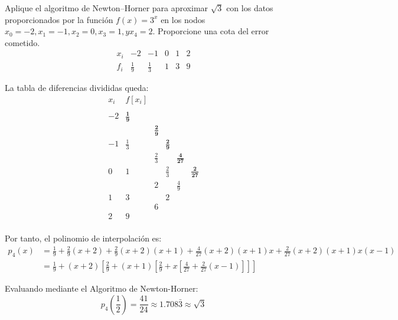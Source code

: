 \begin{ejercicio}
    Aplique el algoritmo de Newton–Horner para aproximar $\sqrt{3}$ con los datos proporcionados por la función $f(x) = 3^x$ en los nodos $x_0 = -2, x_1 = -1, x_2 = 0, x_3 = 1, y x_4 = 2$. Proporcione una cota del error cometido.
    \begin{equation*}
        \begin{array}{c|ccccc}
            x_i & -2 & -1 & 0 & 1 & 2 \\ \hline
            f_i & \frac{1}{9} & \frac{1}{3} & 1 & 3 & 9
        \end{array}
    \end{equation*}

    La tabla de diferencias divididas queda:
    \begin{equation*}
        \begin{array}{c|cccccc}
            x_i & f[x_i] \\
            \\
            -2 & \mathbf{\frac{1}{9}} \\
            && \mathbf{\frac{2}{9}}\\
            -1 & \frac{1}{3} && \mathbf{\frac{2}{9}}\\
            && \frac{2}{3}&&\mathbf{\frac{4}{27}}\\
            0 & 1 && \frac{2}{3} && \mathbf{\frac{2}{27}}\\
            && 2 && \frac{4}{9}\\
            1 & 3 && 2\\
            && 6\\
            2 & 9\\
        \end{array}
    \end{equation*}

    Por tanto, el polinomio de interpolación es:
    \begin{equation*}\begin{split}
        p_4(x)&=\frac{1}{9}+\frac{2}{9}(x+2) +\frac{2}{9}(x+2)(x+1) + \frac{4}{27}(x+2)(x+1)x + \frac{2}{27}(x+2)(x+1)x(x-1) \\
        &= \frac{1}{9}+(x+2)\left[\frac{2}{9} +(x+1)\left[\frac{2}{9} +x\left[\frac{4}{27}+\frac{2}{27}(x-1)\right]\right]\right]
    \end{split}\end{equation*}

    Evaluando mediante el Algoritmo de Newton-Horner:
    \begin{equation*}
        p_4\left(\frac{1}{2}\right) = \frac{41}{24} \approx 1.708\bar{3} \approx \sqrt{3}
    \end{equation*}


\end{ejercicio}
